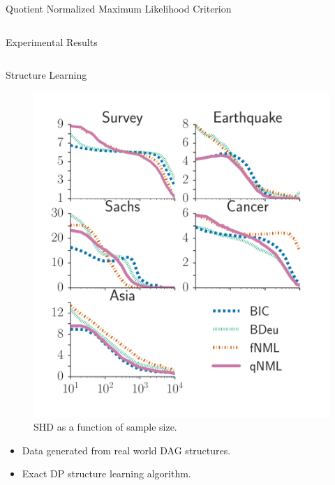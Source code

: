 \documentclass[final]{beamer}
\newcommand{\heading}[1]{\alert{\large #1}\\}
\theoremstyle{plain}
\begin{document}
\begin{frame}{}
\begin{block}{Quotient Normalized Maximum Likelihood Criterion}
\begin{columns}[T]
\begin{column}{0.25\textwidth}
   \end{column} 
   
   
   
\end{columns}
\end{block}

\begin{block}{Experimental Results}
  \begin{columns}[T]
    \begin{column}{0.35\textwidth}
      \heading{Structure Learning}
      
	  \begin{minipage}{0.45\textwidth}
	  \begin{figure}[h]

		\includegraphics[width=\columnwidth]{shd_all.pdf}
		\caption{SHD as a function of sample size.}
		\label{fig:all_shd}
		\end{figure}
	  \end{minipage}
	  \begin{minipage}{0.45\textwidth}
	  \begin{itemize}
	  \item Data generated from real world DAG structures.
	  \item Exact DP structure learning algorithm.

\end{itemize}
\end{minipage}
\end{column}
\end{columns}
\end{block}
\end{frame}
\end{document}
